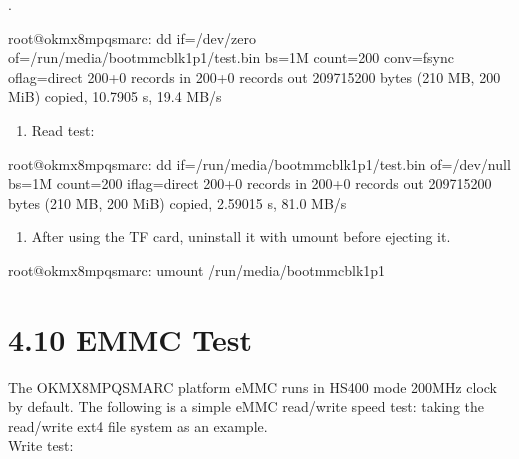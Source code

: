 \documentclass[letterpaper,10pt,openany,english]{sphinxmanual}
\begin{document}
\sphinxAtStartPar
{}.

\begin{sphinxVerbatim}[commandchars=\\\{\}]
root@ok\PYGZhy{}mx8mpq\PYGZhy{}smarc:\PYGZti{}\PYGZsh{} dd if=/dev/zero of=/run/media/boot\PYGZhy{}mmcblk1p1/test.bin \PYGZbs{}
bs=1M count=200 conv=fsync oflag=direct
200+0 records in
200+0 records out
209715200 bytes (210 MB, 200 MiB) copied, 10.7905 s, 19.4 MB/s
\end{sphinxVerbatim}
\begin{enumerate}
%
\setcounter{enumi}{3}
\item {} 
\sphinxAtStartPar
Read test:

\end{enumerate}

\sphinxAtStartPar
{}

\begin{sphinxVerbatim}[commandchars=\\\{\}]
root@ok\PYGZhy{}mx8mpq\PYGZhy{}smarc:\PYGZti{}\PYGZsh{} dd if=/run/media/boot\PYGZhy{}mmcblk1p1/test.bin of=/dev/null \PYGZbs{}
bs=1M count=200 iflag=direct
200+0 records in
200+0 records out
209715200 bytes (210 MB, 200 MiB) copied, 2.59015 s, 81.0 MB/s
\end{sphinxVerbatim}
\begin{enumerate}
%
\setcounter{enumi}{4}
\item {} 
\sphinxAtStartPar
After using the TF card, uninstall it with umount before ejecting it.

\end{enumerate}

\begin{sphinxVerbatim}[commandchars=\\\{\}]
root@ok\PYGZhy{}mx8mpq\PYGZhy{}smarc:\PYGZti{}\PYGZsh{} umount /run/media/boot\PYGZhy{}mmcblk1p1
\end{sphinxVerbatim}

\sphinxAtStartPar
{}


\section{4.10 EMMC Test}
\label{\detokenize{linux-manual:emmc-test}}
\sphinxAtStartPar
The OK\sphinxhyphen{}MX8MPQ\sphinxhyphen{}SMARC platform eMMC runs in HS400 mode 200MHz clock by default. The following is a simple eMMC read/write speed test: taking the read/write ext4 file system as an example.\\
Write test:
\end{document}
